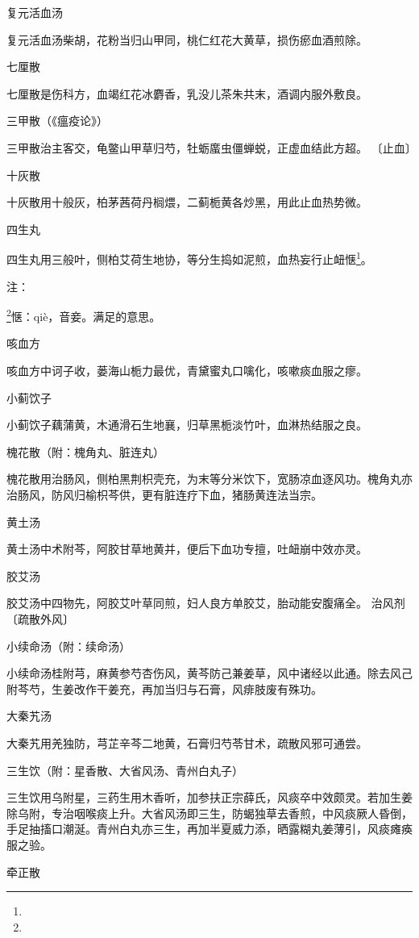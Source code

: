 \documentclass[a4paper,12pt,UTF8,twoside]{ctexbook}
\begin{document}
复元活血汤

复元活血汤柴胡，花粉当归山甲同，桃仁红花大黄草，损伤瘀血酒煎除。

七厘散

七厘散是伤科方，血竭红花冰麝香，乳没儿茶朱共末，酒调内服外敷良。

三甲散（《瘟疫论》）

三甲散治主客交，龟鳖山甲草归芍，牡蛎䗪虫僵蝉蜕，正虚血结此方超。
〔止血〕

十灰散

十灰散用十般灰，柏茅茜荷丹榈煨，二蓟栀黄各炒黑，用此止血热势微。

四生丸

四生丸用三般叶，侧柏艾荷生地协，等分生捣如泥煎，血热妄行止衄惬\footnote{}。

注：

\footnote{}惬：qiè，音妾。满足的意思。

咳血方

咳血方中诃子收，蒌海山栀力最优，青黛蜜丸口噙化，咳嗽痰血服之瘳。

小蓟饮子

小蓟饮子藕蒲黄，木通滑石生地襄，归草黑栀淡竹叶，血淋热结服之良。

槐花散（附：槐角丸、脏连丸）

槐花散用治肠风，侧柏黑荆枳壳充，为末等分米饮下，宽肠凉血逐风功。槐角丸亦治肠风，防风归榆枳芩供，更有脏连疗下血，猪肠黄连法当宗。

黄土汤

黄土汤中术附芩，阿胶甘草地黄并，便后下血功专擅，吐衄崩中效亦灵。

胶艾汤

胶艾汤中四物先，阿胶艾叶草同煎，妇人良方单胶艾，胎动能安腹痛全。
治风剂
〔疏散外风〕

小续命汤（附：续命汤）

小续命汤桂附芎，麻黄参芍杏伤风，黄芩防己兼姜草，风中诸经以此通。除去风己附芩芍，生姜改作干姜充，再加当归与石膏，风痱肢废有殊功。

大秦艽汤

大秦艽用羌独防，芎芷辛芩二地黄，石膏归芍苓甘术，疏散风邪可通尝。

三生饮（附：星香散、大省风汤、青州白丸子）

三生饮用乌附星，三药生用木香听，加参扶正宗薛氏，风痰卒中效颇灵。若加生姜除乌附，专治咽喉痰上升。大省风汤即三生，防蝎独草去香煎，中风痰厥人昏倒，手足抽搐口潮涎。青州白丸亦三生，再加半夏威力添，晒露糊丸姜薄引，风痰瘫痪服之验。

牵正散
\end{document}
